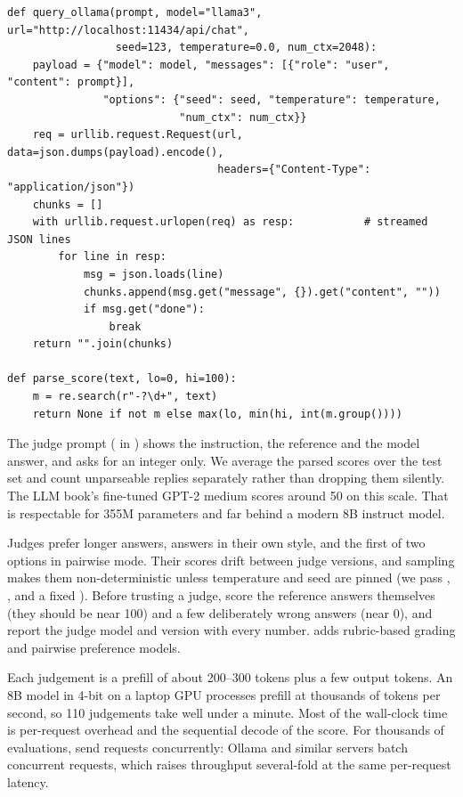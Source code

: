 \begin{lstlisting}[caption={A minimal Ollama client and a scoring prompt.},label={lst:instruct:ollama}]
def query_ollama(prompt, model="llama3", url="http://localhost:11434/api/chat",
                 seed=123, temperature=0.0, num_ctx=2048):
    payload = {"model": model, "messages": [{"role": "user", "content": prompt}],
               "options": {"seed": seed, "temperature": temperature,
                           "num_ctx": num_ctx}}
    req = urllib.request.Request(url, data=json.dumps(payload).encode(),
                                 headers={"Content-Type": "application/json"})
    chunks = []
    with urllib.request.urlopen(req) as resp:           # streamed JSON lines
        for line in resp:
            msg = json.loads(line)
            chunks.append(msg.get("message", {}).get("content", ""))
            if msg.get("done"):
                break
    return "".join(chunks)

def parse_score(text, lo=0, hi=100):
    m = re.search(r"-?\d+", text)
    return None if not m else max(lo, min(hi, int(m.group())))
\end{lstlisting}

The judge prompt ( in ) shows the
instruction, the reference and the model answer, and asks for an integer only. We
average the parsed scores over the test set and count unparseable replies separately
rather than dropping them silently. The LLM book's fine-tuned GPT-2 medium scores
around 50 on this scale. That is respectable for 355M parameters and far behind a
modern 8B instruct model.

\begin{pitfall}
Judges prefer longer answers, answers in their own style, and the first of two options
in pairwise mode. Their scores drift between judge versions, and sampling makes them
non-deterministic unless temperature and seed are pinned (we pass
, , and a fixed ). Before trusting
a judge, score the reference answers themselves (they should be near 100) and a few
deliberately wrong answers (near 0), and report the judge model and version with every
number.  adds rubric-based grading and pairwise preference models.
\end{pitfall}

\begin{napkinmath}
Each judgement is a prefill of about 200--300 tokens plus a few output tokens. An 8B
model in 4-bit on a laptop GPU processes prefill at thousands of tokens per second, so
110 judgements take well under a minute. Most of the wall-clock time is per-request
overhead and the sequential decode of the score. For thousands of evaluations, send
requests concurrently: Ollama and similar servers batch concurrent requests, which
raises throughput several-fold at the same per-request latency.
\end{napkinmath}

